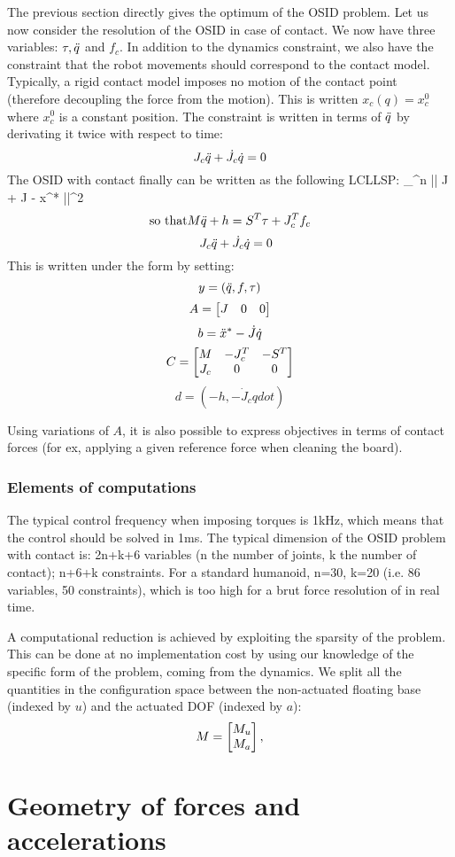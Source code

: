 \documentclass{book}
\begin{document}
The previous section directly gives the optimum of the OSID problem. Let us now consider the resolution of the OSID in case of contact. We now have three variables: $\tau, \ddot q$ and $f_c$. In addition to the dynamics constraint, we also have the constraint that the robot movements should correspond to the contact model. Typically, a rigid contact model imposes no motion of the contact point (therefore decoupling the force from the motion). This is written $x_c(q) = x_c^0$ where $x_c^0$ is a constant position. The constraint is written in terms of $\ddot q$ by derivating it twice with respect to time:
$$ J_c \ddot q + \dot J_c \dot q = 0$$
The OSID with contact finally can be written as the following LCLLSP:
 \min_{\tau \in {}^n} || J \qddot + \dot J \qdot - \ddot x^* ||^2 \EOUT
$$ \textrm{so that} M \ddot q + h = S^T \tau + J_c^T f_c$$
$$ \quad J_c \ddot q + \dot J_c \dot q = 0$$
This is written under the form  by setting:
$$ y = (\ddot q, f, \tau)$$
$$ A = \begin{bmatrix} J & 0 & 0 \end{bmatrix}$$
$$ b = \ddot x^* - \dot J \dot q$$
$$ C = \begin{bmatrix}  M & -J_c^T & -S^T \\ J_c & 0 & 0 \end{bmatrix}$$
$$ d = (-h, -\dot J_c qdot)$$

Using variations of $A$, it is also possible to express objectives in terms of contact forces (for ex, applying a given reference force when cleaning the board).

\subsection{Elements of computations}

The typical control frequency when imposing torques is 1kHz, which means that the control should be solved in 1ms. The typical dimension of the OSID problem with contact is: 2n+k+6 variables (n the number of joints, k the number of contact); n+6+k constraints. For a standard humanoid, n=30, k=20 (i.e. 86 variables, 50 constraints), which is too high for a brut force resolution of  in real time.

A computational reduction is achieved by exploiting the sparsity of the problem. This can be done at no implementation cost by using our knowledge of the specific form of the problem, coming from the dynamics. We split all the quantities in the configuration space between the non-actuated floating base (indexed by $u$) and the actuated DOF (indexed by $a$):
$$ M = \begin{bmatrix} M_u \\ M_a \end{bmatrix}, $$


\chapter{Geometry of forces and accelerations}
\end{document}
